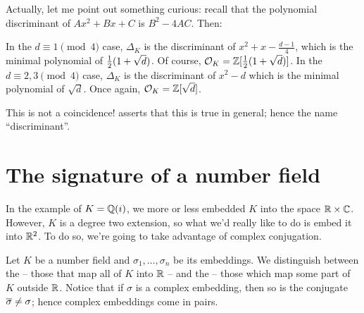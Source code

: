 Actually, let me point out something curious: recall that the polynomial discriminant of $Ax^2+Bx+C$ is $B^2-4AC$. Then:
\begin{itemize}
	\ii In the $d \equiv 1 \pmod 4$ case,
	$\Delta_K$ is the discriminant of $x^2 + x - \frac{d-1}{4}$,
	which is the minimal polynomial of $\frac{1}{2}(1+\sqrt d)$. Of course, $\mathcal O_K = \mathbb Z[\frac{1}{2}(1+\sqrt d)]$.
	\ii In the $d \equiv 2,3 \pmod 4$ case,
	$\Delta_K$ is the discriminant of $x^2 - d$
	which is the minimal polynomial of $\sqrt d$. Once again, $\mathcal O_K = \mathbb Z[\sqrt d]$.
\end{itemize}
This is not a coincidence!  asserts that this is true in general;
hence the name ``discriminant''.

\section{The signature of a number field}
In the example of $K = \mathbb Q(i)$, we more or less embedded $K$ into the space $\mathbb R \times \mathbb C$.
However, $K$ is a degree two extension, so what we'd really like to do is embed it into $\mathbb R^2$.
To do so, we're going to take advantage of complex conjugation.

Let $K$ be a number field and $\sigma_1, \dots, \sigma_n$ be its embeddings.
We distinguish between the  -- those that map all of $K$ into $\mathbb R$ --
and the  -- those which map some part of $K$ outside $\mathbb R$.
Notice that if $\sigma$ is a complex embedding, then so is the conjugate $\overline{\sigma} \ne \sigma$;
hence complex embeddings come in pairs.

